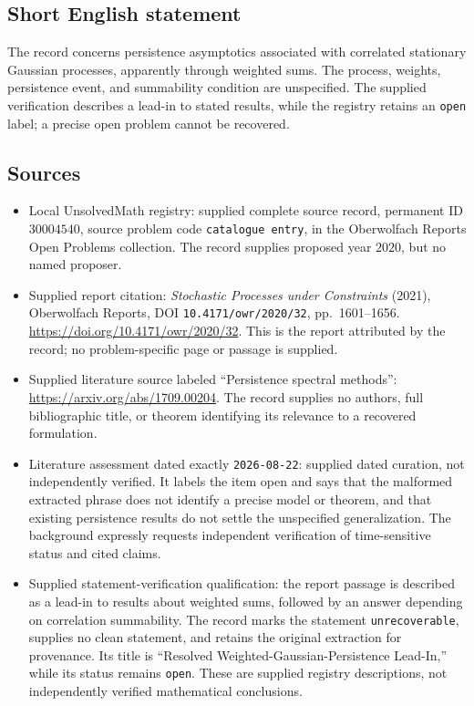 \documentclass[11pt]{article}
\begin{document}
\subsection{Short English statement}
The record concerns persistence asymptotics associated with correlated stationary Gaussian processes, apparently through weighted sums. The process, weights, persistence event, and summability condition are unspecified. The supplied verification describes a lead-in to stated results, while the registry retains an \texttt{open} label; a precise open problem cannot be recovered.
\subsection{Sources}
\begin{itemize}
\item Local UnsolvedMath registry: supplied complete source record, permanent ID \(30004540\), source problem code \texttt{catalogue entry}, in the Oberwolfach Reports Open Problems collection. The record supplies proposed year \(2020\), but no named proposer.
\item Supplied report citation: \emph{Stochastic Processes under Constraints} (2021), Oberwolfach Reports, DOI \texttt{10.4171/owr/2020/32}, pp.~1601--1656. \url{https://doi.org/10.4171/owr/2020/32}. This is the report attributed by the record; no problem-specific page or passage is supplied.
\item Supplied literature source labeled ``Persistence spectral methods'': \url{https://arxiv.org/abs/1709.00204}. The record supplies no authors, full bibliographic title, or theorem identifying its relevance to a recovered formulation.
\item Literature assessment dated exactly \texttt{2026-08-22}: supplied dated curation, not independently verified. It labels the item open and says that the malformed extracted phrase does not identify a precise model or theorem, and that existing persistence results do not settle the unspecified generalization. The background expressly requests independent verification of time-sensitive status and cited claims.
\item Supplied statement-verification qualification: the report passage is described as a lead-in to results about weighted sums, followed by an answer depending on correlation summability. The record marks the statement \texttt{unrecoverable}, supplies no clean statement, and retains the original extraction for provenance. Its title is ``Resolved Weighted-Gaussian-Persistence Lead-In,'' while its status remains \texttt{open}. These are supplied registry descriptions, not independently verified mathematical conclusions.
\end{itemize}
\end{document}
